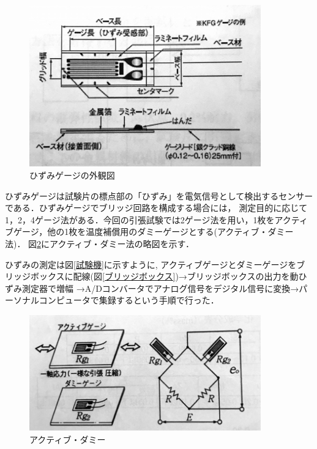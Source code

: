 \documentclass[a4paper,11pt,uplatex]{jsarticle}
\begin{document}
\begin{figure}[H]
  \begin{center}
    \includegraphics[width = 10cm]{画像/ひずみゲージ.png}
    \caption{ひずみゲージの外観図}
    \label{ひずみげーじ}
  \end{center}
\end{figure}

ひずみゲージは試験片の標点部の「ひずみ」を電気信号として検出するセンサーである．ひずみゲージでブリッジ回路を構成する場合には，
測定目的に応じて1，2，4ゲージ法がある．今回の引張試験では2ゲージ法を用い，1枚をアクティブゲージ，他の1枚を温度補償用のダミーゲージとする(アクティブ・ダミー法)．
図\ref{アクティブダミー}にアクティブ・ダミー法の略図を示す．
\par
ひずみの測定は図\ref{試験機}に示すように, アクティブゲージとダミーゲージをブリッジボックスに配線(図\ref{ブリッジボックス})→ブリッジボックスの出力を動ひずみ測定器で増幅
→A/Dコンバータでアナログ信号をデジタル信号に変換→パーソナルコンピュータで集録するという手順で行った．

\begin{figure}[H]
  \begin{center}
    \includegraphics[width = 10cm]{画像/アクティブダミー.png}
    \caption{アクティブ・ダミー}
    \label{アクティブダミー}
  \end{center}
\end{figure}
\end{document}
